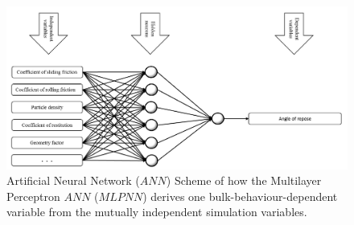 \begin{figure}[!htb]
\centering
\includegraphics[width=.96\columnwidth]{images/18nnscheme}
\caption[ANN Scheme]{Artificial Neural Network ($ANN$) Scheme
of how the Multilayer Perceptron $ANN$ ($MLPNN$) derives one
bulk-behaviour-dependent variable from the mutually independent simulation variables.}
\label{fig:18nnscheme}
\end{figure}